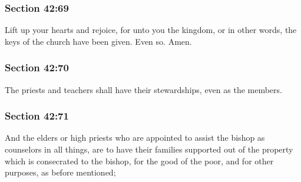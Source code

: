 	\subsubsection{Section 42:69} %
		\label{DC42-69}

		Lift up your hearts and rejoice, for unto you the kingdom, or in other words, the keys of the church have been given. Even so.  Amen.


	\subsubsection{Section 42:70} %
		\label{DC42-70}

		The priests and teachers shall have their stewardships, even as the members.


	\subsubsection{Section 42:71} %
		\label{DC42-71}

		And the elders or high priests who are appointed to assist the bishop as counselors in all things, are to have their families supported out of the property which is consecrated to the bishop, for the good of the poor, and for other purposes, as before mentioned;


